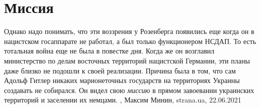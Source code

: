  
 
 
 
 
\chapter{Миссия}

Однако надо понимать, что эти воззрения у Розенберга появились еще когда он в
нацистском госаппарате не работал, а был только функционером НСДАП. То есть
тотальная война еще не была в повестке дня. Когда же он возглавил министерство
по делам восточных территорий нацистской Германии, эти планы даже близко не
подошли к своей реализации.  Причина была в том, что сам Адольф Гитлер никаких
марионеточных государств на территориях Украины создавать не собирался. Он
видел свою \emph{миссию} в прямом завоевании украинских территорий и заселении их
немцами. 
, 
Максим Минин, strana.ua, 22.06.2021
